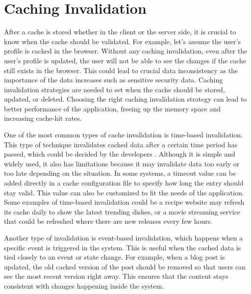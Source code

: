 \section[Caching Invalidation]{Caching Invalidation}
After a cache is stored whether in the client or the server side, it is crucial to know when the cache should be validated.
For example, let's assume the user's profile is cached in the browser. Without any caching invalidation, even after the user's
profile is updated, the user will not be able to see the changes if the cache still exists in the browser. 
This could lead to crucial data inconsistency as the importance of the data increases such as sensitive security data.
Caching invalidation strategies are needed to set when the cache should be stored, updated, or deleted.
Choosing the right caching invalidation strategy can lead to better performance of the application, freeing up the memory space
and increasing cache-hit rates. 


One of the most common types of cache invalidation is time-based invalidation. This type of technique invalidates cached data
after a certain time period has passed, which could be decided by the developers \cite{Redis_2025}.
Although it is simple and widely used, it also has limitations because it may invalidate data too early or too late depending on the situation.
In some systems, a timeout value can be added directly in a cache configuration file to specify how long the entry should stay valid.
This value can also be customized to fit the needs of the application. 
Some examples of time-based invalidation could be a recipe website may refresh its cache daily to show the latest trending dishes, 
or a movie streaming service that could be refreshed where there are new releases every few hours.

Another type of invalidation is event-based invalidation, which happens when a specific event is triggered in the system.
This is useful when the cached data is tied closely to an event or state change.
For example, when a blog post is updated, the old cached version of the post should be removed so that users can see the most recent version right away.
This ensures that the content stays consistent with changes happening inside the system.

